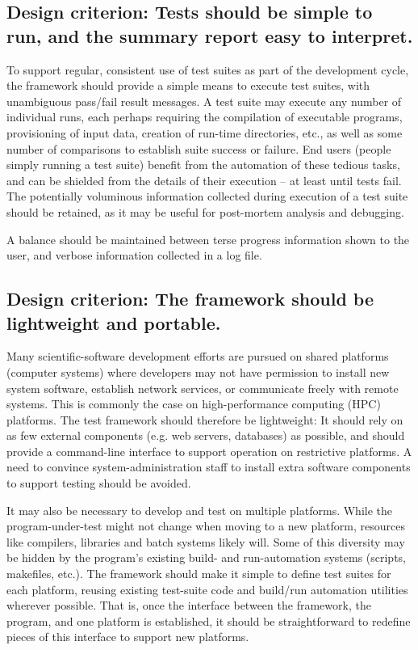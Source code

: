 \documentclass[conference]{IEEEtran}
\begin{document}
\subsection{Design criterion: Tests should be simple to run, and the summary report easy to interpret.}

To support regular, consistent use of test suites as part of the development cycle, the framework should provide a simple means to execute test suites, with unambiguous pass/fail result messages. A test suite may execute any number of individual runs, each perhaps requiring the compilation of executable programs, provisioning of input data, creation of run-time directories, etc., as well as some number of comparisons to establish suite success or failure. End users (people simply running a test suite) benefit from the automation of these tedious tasks, and can be shielded from the details of their execution -- at least until tests fail. The potentially voluminous information collected during execution of a test suite should be retained, as it may be useful for post-mortem analysis and debugging.

A balance should be maintained between terse progress information shown to the user, and verbose information collected in a log file.

\subsection{Design criterion: The framework should be lightweight and portable.}

Many scientific-software development efforts are pursued on shared platforms (computer systems) where developers may not have permission to install new system software, establish network services, or communicate freely with remote systems. This is commonly the case on high-performance computing (HPC) platforms. The test framework should therefore be lightweight: It should rely on as few external components (e.g. web servers, databases) as possible, and should provide a command-line interface to support operation on restrictive platforms. A need to convince system-administration staff to install extra software components to support testing should be avoided.

It may also be necessary to develop and test on multiple platforms. While the program-under-test might not change when moving to a new platform, resources like compilers, libraries and batch systems likely will. Some of this diversity may be hidden by the program's existing build- and run-automation systems (scripts, makefiles, etc.). The framework should make it simple to define test suites for each platform, reusing existing test-suite code and build/run automation utilities wherever possible. That is, once the interface between the framework, the program, and one platform is established, it should be straightforward to redefine pieces of this interface to support new platforms.
\end{document}
